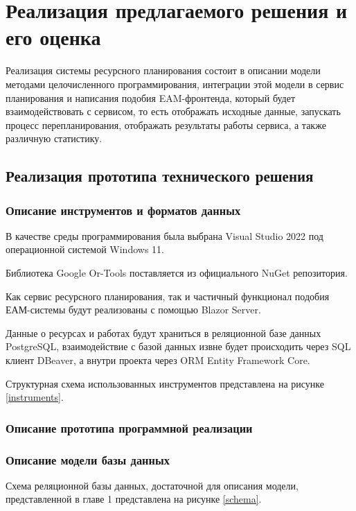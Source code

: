 \section{Реализация предлагаемого решения и его оценка}

Реализация системы ресурсного планирования состоит в описании модели методами целочисленного программирования, интеграции этой модели в сервис планирования и написания подобия EAM-фронтенда, который будет взаимодействовать с сервисом, то есть отображать исходные данные, запускать процесс перепланирования, отображать результаты работы сервиса, а также различную статистику.

\subsection{Реализация прототипа технического решения}

\subsubsection{Описание инструментов и форматов данных}

В качестве среды программирования была выбрана Visual Studio 2022 под операционной системой Windows 11.

Библиотека Google Or-Tools поставляется из официального NuGet репозитория.

Как сервис ресурсного планирования, так и частичный функционал подобия ЕАМ-системы будут реализованы с помощью Blazor Server.

Данные о ресурсах и работах будут храниться в реляционной базе данных PostgreSQL, взаимодействие с базой данных извне будет происходить через SQL клиент DBeaver, а внутри проекта через ORM Entity Framework Core.

Структурная схема использованных инструментов представлена на рисунке \ref{instruments}.


\subsubsection{Описание прототипа программной реализации}
\subsubsection{Описание модели базы данных}

Схема реляционной базы данных, достаточной для описания модели, представленной в главе 1 представлена на рисунке \ref{schema}.

